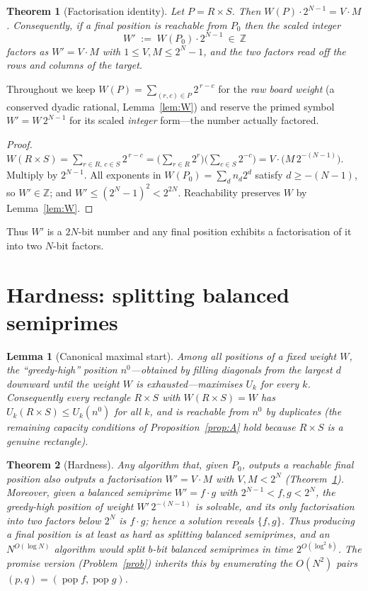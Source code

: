 \documentclass[11pt]{article}
\theoremstyle{definition}
\theoremstyle{plain}
\newtheorem{lemma}{Lemma}
\newtheorem{theorem}{Theorem}
\theoremstyle{remark}
\newcommand{\Z}{\mathbb{Z}}
\newcommand{\popc}{\operatorname{pop}}
\begin{document}
\begin{theorem}[Factorisation identity]\label{thm:fact}
Let $P=R\times S$.  Then $W(P)\cdot 2^{N-1}=V\cdot M$.  Consequently, if a final
position is reachable from $P_0$ then the \emph{scaled integer}
\[
W' \;:=\; W(P_0)\cdot 2^{N-1}\ \in\ \Z
\]
factors as $W'=V\cdot M$ with $1\le V,M\le 2^{N}-1$, and the two factors read off
the rows and columns of the target.
\end{theorem}
Throughout we keep $W(P)=\sum_{(r,c)\in P}2^{\,r-c}$ for the \emph{raw board weight}
(a conserved dyadic rational, Lemma~\ref{lem:W}) and reserve the primed symbol $W'=W\,2^{N-1}$
for its scaled \emph{integer} form---the number actually factored.
\begin{proof}
$W(R\times S)=\sum_{r\in R,\,c\in S}2^{\,r-c}
=\bigl(\sum_{r\in R}2^{r}\bigr)\bigl(\sum_{c\in S}2^{-c}\bigr)
=V\cdot\bigl(M\,2^{-(N-1)}\bigr)$.  Multiply by $2^{N-1}$.  All exponents in
$W(P_0)=\sum_d n_d 2^{d}$ satisfy $d\ge-(N-1)$, so $W'\in\Z$; and
$W'\le(2^{N}-1)^2<2^{2N}$.  Reachability preserves $W$ by Lemma~\ref{lem:W}.
\end{proof}

Thus $W'$ is a $2N$-bit number and any final position exhibits a factorisation of
it into two $N$-bit factors.

\section{Hardness: splitting balanced semiprimes}\label{sec:hard}

\begin{lemma}[Canonical maximal start]\label{lem:high}
Among all positions of a fixed weight $W$, the ``greedy-high'' position
$n^{0}$---obtained by filling diagonals from the largest $d$ downward until the
weight $W$ is exhausted---maximises $U_k$ for every $k$.  Consequently every
rectangle $R\times S$ with $W(R\times S)=W$ has $U_k(R\times S)\le U_k(n^{0})$ for
all $k$, and is reachable from $n^{0}$ by duplicates (the remaining capacity
conditions of Proposition~\ref{prop:A} hold because $R\times S$ is a genuine
rectangle).
\end{lemma}

\begin{theorem}[Hardness]\label{thm:hard}
Any algorithm that, given $P_0$, outputs a reachable final position also outputs a
factorisation $W'=V\cdot M$ with $V,M<2^{N}$ (Theorem~\ref{thm:fact}).  Moreover,
given a balanced semiprime $W'=f\cdot g$ with $2^{N-1}<f,g<2^{N}$, the greedy-high
position of weight $W'\,2^{-(N-1)}$ is solvable, and its only factorisation into
two factors below $2^{N}$ is $f\cdot g$; hence a solution reveals $\{f,g\}$.  Thus
producing a final position is at least as hard as splitting balanced semiprimes,
and an $N^{O(\log N)}$ algorithm would split $b$-bit balanced semiprimes in time
$2^{O(\log^2 b)}$.  The promise version (Problem~\ref{prob}) inherits this by
enumerating the $O(N^2)$ pairs $(p,q)=(\popc f,\popc g)$.
\end{theorem}
\end{document}

